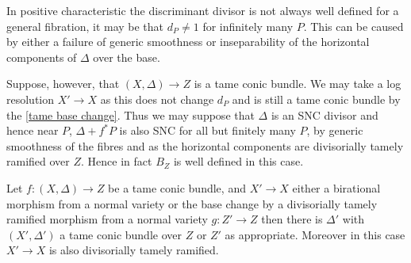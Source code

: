 \documentclass[a4paper,12pt]{book}
\begin{document}
In positive characteristic the discriminant divisor is not always well defined for a general fibration, it may be that $d_{P} \neq 1$ for infinitely many $P$. This can be caused by either a failure of generic smoothness or inseparability of the horizontal components of $\Delta$ over the base.

Suppose, however, that $(X,\Delta) \to Z$ is a tame conic bundle. We may take a log resolution $X' \to X$ as this does not change $d_{P}$ and is still a tame conic bundle by the \autoref{tame base change}. Thus we may suppose that $\Delta$ is an SNC divisor and hence near $P$, $\Delta+f^{*}P$ is also SNC for all but finitely many $P$, by generic smoothness of the fibres and as the horizontal components are divisorially tamely ramified over $Z$. Hence in fact $B_{Z}$ is well defined in this case.

\begin{lemma}\label{tame base change}
	Let $f\colon (X,\Delta) \to Z$ be a tame conic bundle, and $X' \to X$ either a birational morphism from a normal variety or the base change by a divisorially tamely ramified morphism from a normal variety $g\colon Z' \to Z$ then there is $\Delta'$ with $(X',\Delta')$ a tame conic bundle over $Z$ or $Z'$ as appropriate. Moreover in this case $X' \to X$ is also divisorially tamely ramified.
\end{lemma}
\end{document}
